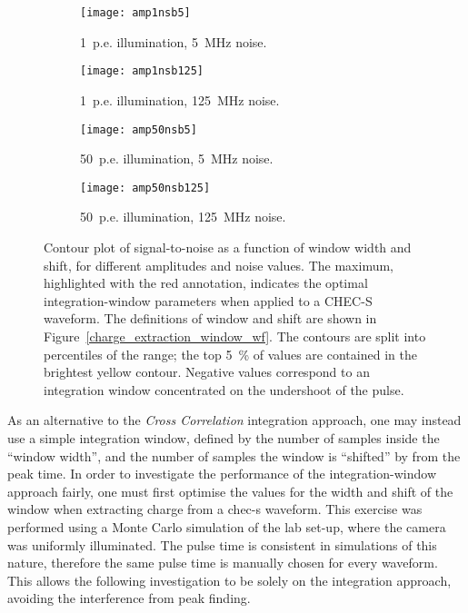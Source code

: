 \begin{figure}
  \begin{subfigure}[b]{0.49\textwidth}
    \texttt{[image: amp1nsb5]}
    \caption{1~p.e. illumination, 5~MHz noise.}
    \label{fig:amp1nsb5}
  \end{subfigure}
  \hfill
  \begin{subfigure}[b]{0.49\textwidth}
    \texttt{[image: amp1nsb125]}
    \caption{1~p.e. illumination, 125~MHz noise.}
    \label{fig:amp1nsb125}
  \end{subfigure}
  \hfill
  \begin{subfigure}[b]{0.49\textwidth}
    \texttt{[image: amp50nsb5]}
    \caption{50~p.e. illumination, 5~MHz noise.}
    \label{fig:amp50nsb5}
  \end{subfigure}
  \hfill
  \begin{subfigure}[b]{0.49\textwidth}
    \texttt{[image: amp50nsb125]}
    \caption{50~p.e. illumination, 125~MHz noise.}
    \label{fig:amp50nsb125}
  \end{subfigure}
  \caption[Optimal integration-window parameters.]{Contour plot of signal-to-noise as a function of window width and shift, for different amplitudes and noise values. The maximum, highlighted with the red annotation, indicates the optimal integration-window parameters when applied to a CHEC-S waveform. The definitions of window and shift are shown in Figure~\ref{charge_extraction_window_wf}. The contours are split into percentiles of the range; the top \SI{5}{\percent} of values are contained in the brightest yellow contour. Negative values correspond to an integration window concentrated on the undershoot of the pulse.}
  \label{fig:snr_noc}
\end{figure}

As an alternative to the \textit{Cross Correlation} integration approach, one may instead use a simple integration window, defined by the number of samples inside the ``window width'', and the number of samples the window is ``shifted'' by from the peak time. In order to investigate the performance of the integration-window approach fairly, one must first optimise the values for the width and shift of the window when extracting charge from a \gls{chec-s} waveform. This exercise was performed using a Monte Carlo simulation of the lab set-up, where the camera was uniformly illuminated. The pulse time is consistent in simulations of this nature, therefore the same pulse time is manually chosen for every waveform. This allows the following investigation to be solely on the integration approach, avoiding the interference from peak finding.

